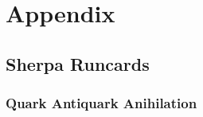 \chapter{Appendix}%
\label{chap:appendix}

\section{Sherpa Runcards}%
\label{sec:runcards}

\subsection{Quark Antiquark Anihilation}%
\label{sec:qqggruncard}
